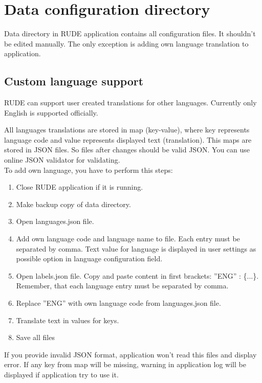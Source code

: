 \section{Data configuration directory}\label{section:data-config}

Data directory in RUDE application contains all configuration files. It shouldn't be edited manually. The only exception is adding own language translation to application.

\subsection{Custom language support}\label{sub:config-labels}

RUDE can support user created translations for other languages. Currently only English is supported officially.

All languages translations are stored in map (key-value), where key represents language code and value represents displayed text (translation). This maps are stored in JSON files. So files after changes should be valid JSON. You can use online JSON validator for validating.\\

To add own language, you have to perform this steps:
\begin{enumerate}
	\item Close RUDE application if it is running.
	\item Make backup copy of data directory.
	\item Open languages.json file.
	\item Add own language code and language name to file. Each entry must be separated by comma. Text value for language is displayed in user settings as possible option in language configuration field.
	\item Open labels.json file. Copy and paste content in first brackets: ''ENG'' : \{...\}. Remember, that each language entry must be separated by comma.
	\item Replace ''ENG'' with own language code from languages.json file.
	\item Translate text in values for keys.
	\item Save all files
\end{enumerate}


If you provide invalid JSON format, application won't read this files and display error. If any key from map will be missing, warning in application log will be displayed if application try to use it.

\vfill\newpage